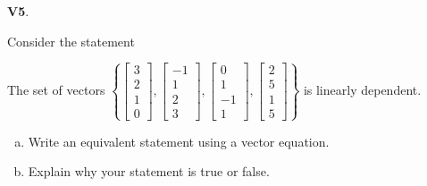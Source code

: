 \documentclass{article}
\newenvironment{problem}[1]
{
  \begin{flushleft}
  \textbf{#1}.
  \ignorespaces
}
{
  \end{flushleft}
}
\begin{document}
\begin{problem}{V5}
Consider the statement

\begin{center}\begin{minipage}{0.8\textwidth}
The set of vectors
\(\left\{
 \begin{bmatrix} 3 \\ 2 \\ 1 \\ 0 \end{bmatrix}  ,
 \begin{bmatrix} -1 \\ 1 \\ 2 \\ 3 \end{bmatrix}  ,
 \begin{bmatrix} 0 \\ 1 \\ -1 \\ 1 \end{bmatrix}  , 
 \begin{bmatrix} 2 \\ 5 \\ 1 \\ 5 \end{bmatrix} \right\}\)
is linearly dependent.
\end{minipage}\end{center}
\begin{enumerate}[(a)]
\item Write an equivalent statement using a vector equation.
\item Explain why your statement is true or false.
\end{enumerate}
\end{problem}
\end{document}
